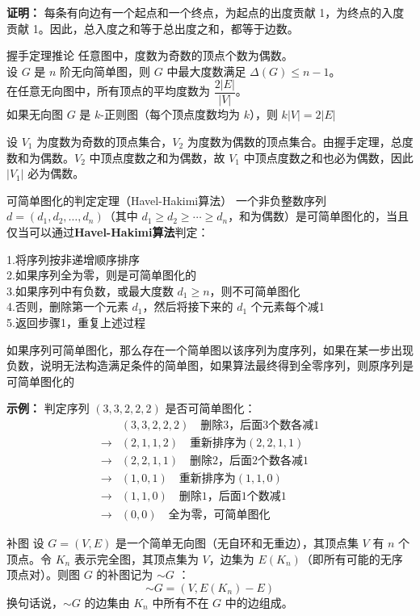 \textbf{证明：} 每条有向边有一个起点和一个终点，为起点的出度贡献 1，为终点的入度贡献 1。因此，总入度之和等于总出度之和，都等于边数。
\begin{theorem}{握手定理推论}{}
任意图中，度数为奇数的顶点个数为偶数。\\
设 $G$ 是 $n$ 阶无向简单图，则 $G$ 中最大度数满足 $\Delta(G) \leqslant n-1$。\\
在任意无向图中，所有顶点的平均度数为 $\dfrac{2|E|}{|V|}$。\\
如果无向图 $G$ 是 $k$-正则图（每个顶点度数均为 $k$），则 $k|V| = 2|E|$
\end{theorem}
设 $V_1$ 为度数为奇数的顶点集合，$V_2$ 为度数为偶数的顶点集合。由握手定理，总度数和为偶数。$V_2$ 中顶点度数之和为偶数，故 $V_1$ 中顶点度数之和也必为偶数，因此 $|V_1|$ 必为偶数。

\begin{theorem}{可简单图化的判定定理（Havel-Hakimi算法）}{}
一个非负整数序列 $d = (d_1, d_2, \ldots, d_n)$（其中 $d_1 \geqslant d_2 \geqslant \cdots \geqslant d_n$，和为偶数）是可简单图化的，当且仅当可以通过\textbf{Havel-Hakimi算法}判定：

1.将序列按非递增顺序排序\\
2.如果序列全为零，则是可简单图化的\\
3.如果序列中有负数，或最大度数 $d_1 \geqslant n$，则不可简单图化\\
4.否则，删除第一个元素 $d_1$，然后将接下来的 $d_1$ 个元素每个减1\\
5.返回步骤1，重复上述过程

如果序列可简单图化，那么存在一个简单图以该序列为度序列，如果在某一步出现负数，说明无法构造满足条件的简单图，如果算法最终得到全零序列，则原序列是可简单图化的
\end{theorem}
\textbf{示例：}
判定序列 $(3, 3, 2, 2, 2)$ 是否可简单图化：
\begin{align*}
& (3, 3, 2, 2, 2) \quad \text{删除3，后面3个数各减1} \\
\to & (2, 1, 1, 2) \quad \text{重新排序为}(2, 2, 1, 1) \\
\to & (2, 2, 1, 1) \quad \text{删除2，后面2个数各减1} \\
\to & (1, 0, 1) \quad \text{重新排序为}(1, 1, 0) \\
\to & (1, 1, 0) \quad \text{删除1，后面1个数减1} \\
\to & (0, 0) \quad \text{全为零，可简单图化}
\end{align*}
\begin{definition}{补图}{}
设 $G = (V, E)$ 是一个简单无向图（无自环和无重边），其顶点集 $V$ 有 $n$ 个顶点。令 $K_n$ 表示完全图，其顶点集为 $V$，边集为 $E(K_n)$（即所有可能的无序顶点对）。则图 $G$ 的补图记为 $\sim G$ ：
\[
\sim G = (V, E(K_n) -E)
\]
换句话说，$\sim G$ 的边集由 $K_n$ 中所有不在 $G$ 中的边组成。
\end{definition}
